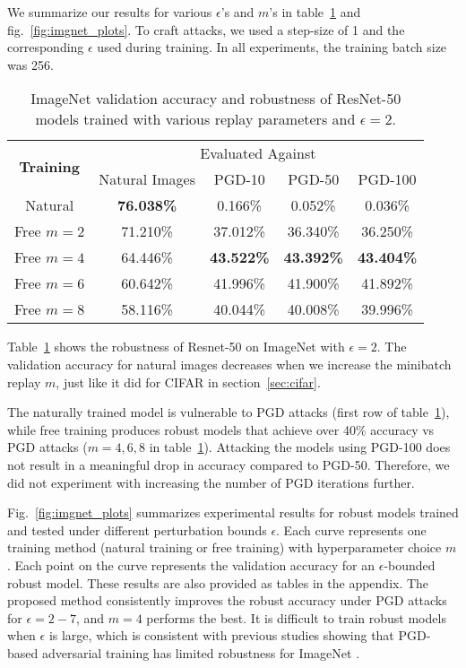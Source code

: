 \documentclass{article}
\begin{document}
We summarize our results for various $\epsilon$'s and $m$'s in table~\ref{tab:imagenet_robustness_eps2} and fig.~\ref{fig:imgnet_plots}.  
To craft attacks, we used a step-size of 1 and the corresponding $\epsilon$ used during training. In all experiments, the training batch size was 256. 
\begin{table}
    \centering
    \caption{ImageNet validation accuracy and robustness of ResNet-50 models trained with various replay parameters and $\epsilon=2$.
    } 
    \begin{tabular}{|c||c|c|c|c|}
    \hline
     \multirow{2}{*}{\textbf{Training}} & \multicolumn{4}{c|}{ Evaluated Against} \\ \cline{2-5} & Natural Images & PGD-10 & PGD-50 & PGD-100 \\ 
    \hline\hline
    Natural & \textbf{76.038\%} & 0.166\% & 0.052\%& 0.036\%\\
    \hline \hline
    Free $m=2$ & 71.210\% & 37.012\% & 36.340\%& 36.250\%\\
    \hline
    Free $m=4$ & 64.446\% & \textbf{43.522\%} & \textbf{43.392\%} & \textbf{43.404\%}\\
    \hline
    Free $m=6$ & 60.642\% & 41.996\% & 41.900\%& 41.892\%\\
    \hline
    Free $m=8$ & 58.116\% & 40.044\% & 40.008\%& 39.996\%\\
    \hline
    \end{tabular}
    \label{tab:imagenet_robustness_eps2}
\end{table}
Table~\ref{tab:imagenet_robustness_eps2} shows the robustness of Resnet-50 on ImageNet with $\epsilon=2$. The validation accuracy for natural images decreases when we increase the minibatch replay $m$, just like it did for CIFAR in section~\ref{sec:cifar}.

The naturally trained model is vulnerable to PGD attacks (first row of table~\ref{tab:imagenet_robustness_eps2}), while free training produces robust models that achieve over 40\% accuracy vs PGD attacks ($m=4,6,8$ in table~\ref{tab:imagenet_robustness_eps2}). 
Attacking the models using PGD-100 does not result in a meaningful drop in accuracy compared to PGD-50. Therefore, we did not experiment with increasing the number of PGD iterations further. 

Fig.~\ref{fig:imgnet_plots} summarizes experimental results for robust models trained and tested under different perturbation bounds $\epsilon$. Each curve represents one training method (natural training or free training) with hyperparameter choice $m$. Each point on the curve represents the validation accuracy for an $\epsilon$-bounded robust model.
These results are also provided as tables in the appendix. 
The proposed method consistently improves the robust accuracy under PGD attacks for $\epsilon=2-7$, and $m=4$ performs the best. 
It is difficult to train robust models when $\epsilon$ is large, which is consistent with previous studies showing that PGD-based adversarial training has limited robustness for ImageNet \citep{kannan2018adversarial}.
\end{document}
